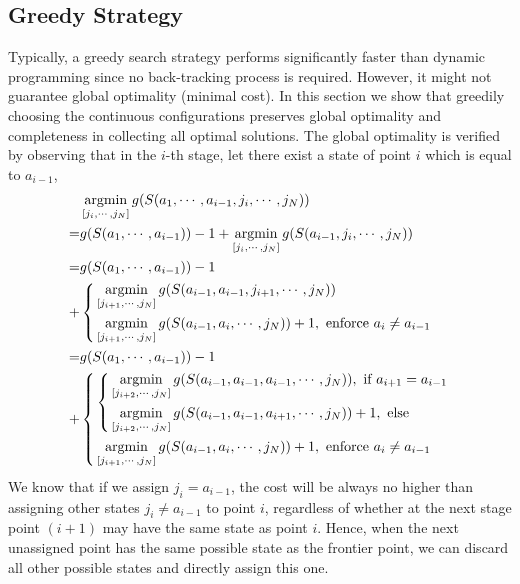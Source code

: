 \documentclass[letterpaper, 10 pt, conference]{ieeeconf}  %
\begin{document}
\subsection{Greedy Strategy}\label{section:greedy}
Typically, a greedy search strategy performs significantly faster than dynamic programming since no back-tracking process is required. 
However, it might not guarantee global optimality (minimal cost). 
In this section we show that greedily choosing the continuous configurations preserves global optimality and completeness in collecting all optimal solutions. 
The global optimality is verified by observing that in the $i$-th stage, let there exist a state of point $i$ which is equal to $a_{i-1}$, 
\begin{equation}\label{equ:optimality}
\begin{aligned}
&\mathop{\rm argmin}\limits_{[j_i, \cdots, j_N]} g(S(a_1, \cdots, a_{i-1}, j_i, \cdots, j_N))\\
=&g(S(a_1, \cdots, a_{i-1})) - 1 + \mathop{\rm argmin}\limits_{[j_i, \cdots, j_N]} g(S(a_{i-1}, j_i, \cdots, j_N))\\
=&g(S(a_1, \cdots, a_{i-1})) - 1 \\
+& \left\{
\begin{aligned}
&\mathop{\rm argmin}\limits_{[j_{i+1}, \cdots, j_N]} g(S(a_{i-1}, a_{i-1}, j_{i+1}, \cdots, j_N))\\
&\mathop{\rm argmin}\limits_{[j_{i+1}, \cdots, j_N]} g(S(a_{i-1}, a_i, \cdots, j_N))+1, \mbox{ enforce }a_i\neq a_{i-1}
\end{aligned}\right.\\
=&g(S(a_1, \cdots, a_{i-1})) - 1 \\
+&\left\{
\begin{aligned}
	&\left\{
	\begin{aligned}
		&\mathop{\rm argmin}\limits_{[j_{i+2}, \cdots, j_N]} g(S(a_{i-1}, a_{i-1}, a_{i-1}, \cdots, j_N)), \mbox{ if } a_{i+1}=a_{i-1}\\
		&\mathop{\rm argmin}\limits_{[j_{i+2}, \cdots, j_N]} g(S(a_{i-1}, a_{i-1}, a_{i+1}, \cdots, j_N))+1, \mbox{ else }
	\end{aligned}
	\right.\\
	&\mathop{\rm argmin}\limits_{[j_{i+1}, \cdots, j_N]} g(S(a_{i-1}, a_i, \cdots, j_N))+1, \mbox{ enforce }a_i\neq a_{i-1}
\end{aligned}
\right.
\end{aligned}
\end{equation}
We know that if we assign $j_i = a_{i-1}$, the cost will be always no higher than assigning other states $j_i\neq a_{i-1}$ to point $i$, 
regardless of whether at the next stage point $(i+1)$ may have the same state as point $i$. 
Hence, when the next unassigned point has the same possible state as the frontier point, we can discard all other possible states and directly assign this one. 
\end{document}
